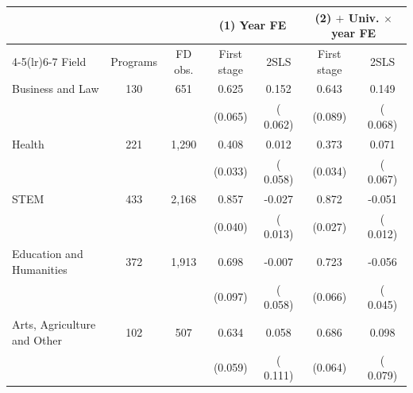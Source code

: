 \begin{tabular}{lcccccc}
\toprule
 & & & \multicolumn{2}{c}{(1) Year FE} & \multicolumn{2}{c}{(2) \(+\) Univ. \(\times\) year FE} \\
\cmidrule(lr){4-5}\cmidrule(lr){6-7}
Field & Programs & FD obs. & First stage & 2SLS & First stage & 2SLS \\
\midrule
Business and Law &   130 &    651 &  0.625\sym{***} &   0.152\sym{**} &  0.643\sym{***} &   0.149\sym{**} \\
 & &  & (0.065) & ( 0.062) & (0.089) & ( 0.068) \\
Health &   221 &  1,290 &  0.408\sym{***} &   0.012 &  0.373\sym{***} &   0.071 \\
 & &  & (0.033) & ( 0.058) & (0.034) & ( 0.067) \\
STEM &   433 &  2,168 &  0.857\sym{***} &  -0.027\sym{**} &  0.872\sym{***} &  -0.051\sym{***} \\
 & &  & (0.040) & ( 0.013) & (0.027) & ( 0.012) \\
Education and Humanities &   372 &  1,913 &  0.698\sym{***} &  -0.007 &  0.723\sym{***} &  -0.056 \\
 & &  & (0.097) & ( 0.058) & (0.066) & ( 0.045) \\
Arts, Agriculture and Other &   102 &    507 &  0.634\sym{***} &   0.058 &  0.686\sym{***} &   0.098 \\
 & &  & (0.059) & ( 0.111) & (0.064) & ( 0.079) \\
\bottomrule
\end{tabular}
